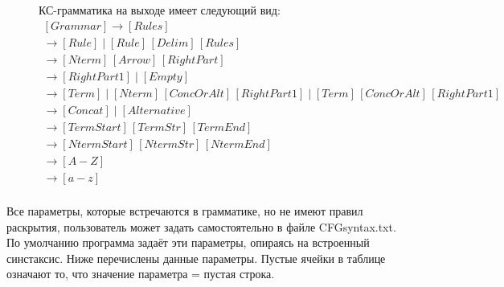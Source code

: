 \documentclass{article}
\begin{document}
\begin{figure}[H]
КС-грамматика на выходе имеет следующий вид:
\centering
        $$\begin{array}{l}
        [Grammar] \to [Rules] \\  
        
        [Rules] \to [Rule] \;|\; [Rule]\,[Delim]\,[Rules] \\

        [Rule] \to [Nterm]\,[Arrow]\,[RightPart]  \\ 
        
        [RightPart] \to [RightPart1] \;|\; [Empty]\\ 

        [RightPart1] \to [Term] \;|\; [Nterm]\,[ConcOrAlt]\,[RightPart1] \;|\; [Term]\,[ConcOrAlt]\,[RightPart1] \\
        
        [ConcOrAlt] \to [Concat] \;|\; [Alternative] \\
        
        [Term] \to [TermStart]\,[TermStr]\,[TermEnd] \\
        
        [Nterm] \to [NtermStart]\,[NtermStr]\,[NtermEnd] \\ 
        
        [NtermStr] \to [A-Z] \\
        
        [TermStr] \to [a-z] \\
        \end{array}$$  
\end{figure}
Все параметры, которые встречаются в грамматике, но не имеют правил раскрытия, пользователь может задать самостоятельно в файле CFGsyntax.txt. По умолчанию программа задаёт эти параметры, опираясь на встроенный синстаксис. Ниже перечислены данные параметры. Пустые ячейки в таблице означают то, что значение параметра = пустая строка.
\end{document}
